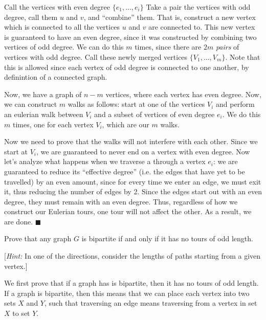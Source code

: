 \documentclass[11pt]{article}
\begin{document}
\begin{Parts}

\begin{solution}
    Call the vertices with even degree $\{e_1, \dots, e_i\}$ Take a pair the vertices with odd degree, call them $u$ and $v$, and ``combine'' them. That is, construct a new vertex which is connected to all the vertices $u$ and $v$ are connected to. This new vertex is guaranteed to have an even degree, since it was constructed by combining two vertices of odd degree. We can do this $m$ times, since there are $2m$ \textit{pairs} of vertices with odd degree. Call these newly merged vertices $\{V_1, \dots, V_m\}$. Note that this is allowed since each vertex of odd degree is connected to one another, by definintion of a connected graph.

    Now, we have a graph of $n - m$ vertices, where each vertex has even degree. Now, we can construct $m$ walks as follows: start at one of the vertices $V_i$ and perform an eulerian walk between $V_i$ and a subset of vertices of even degree $e_i$. We do this $m$ times, one for each vertex $V_i$, which are our $m$ walks. 

    Now we need to prove that the walks will not interfere with each other. Since we start at $V_i$, we are guaranteed to never end on a vertex with even degree. Now let's analyze what happens when we traverse a through a vertex $e_i$: we are guaranteed to reduce its ``effective degree'' (i.e. the edges that have yet to be travelled) by an even amount, since for every time we enter an edge, we must exit it, thus reducing the number of edges by 2. Since the edges start out with an even degree, they must remain with an even degree. Thus, regardless of how we construct our Eulerian tours, one tour will not affect the other. As a result, we are done. $\blacksquare$
\end{solution}

\Part Prove that any graph $G$ is bipartite if and only if it has no tours of odd length.

[\emph{Hint:} In one of the directions, consider the lengths of paths starting from a given vertex.]

\begin{solution}
    We first prove that if a graph has is bipartite, then it has no tours of odd length. If a graph is bipartite, then this means that we can place each vertex into two sets $X$ and $Y$, such that traversing an edge means traversing from a vertex in set $X$ to set $Y$. 


\end{solution}
\end{Parts}
\end{document}
